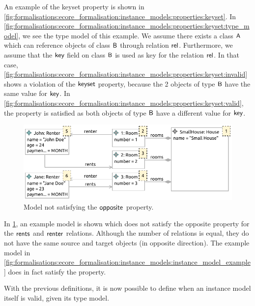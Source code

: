 An example of the keyset property is shown in \cref{fig:formalisations:ecore_formalisation:instance_models:properties:keyset}. In \cref{fig:formalisations:ecore_formalisation:instance_models:properties:keyset:type_model}, we see the type model of this example. We assume there exists a class $\mathsf{A}$ which can reference objects of class $\mathsf{B}$ through relation $\mathsf{rel}$. Furthermore, we assume that the $\mathsf{key}$ field on class $\mathsf{B}$ is used as key for the relation $\mathsf{rel}$. In that case, \cref{fig:formalisations:ecore_formalisation:instance_models:properties:keyset:invalid} shows a violation of the $\mathsf{keyset}$ property, because the 2 objects of type $\mathsf{B}$ have the same value for $\mathsf{key}$. In \cref{fig:formalisations:ecore_formalisation:instance_models:properties:keyset:valid}, the property is satisfied as both objects of type $\mathsf{B}$ have a different value for $\mathsf{key}$.

\begin{figure}[p]
    \centering
    \includegraphics{images/03_formalisations/02_ecore_formalisation/properties/invalid_opposite.pdf}
    \caption{Model not satisfying the $\mathsf{opposite}$ property.}
    \label{fig:formalisations:ecore_formalisation:instance_models:properties:opposite}
\end{figure}

In \cref{fig:formalisations:ecore_formalisation:instance_models:properties:opposite}, an example model is shown which does not satisfy the opposite property for the $\mathsf{rents}$ and $\mathsf{renter}$ relations. Although the number of relations is equal, they do not have the same source and target objects (in opposite direction). The example model in \cref{fig:formalisations:ecore_formalisation:instance_models:instance_model_example} does in fact satisfy the property.

With the previous definitions, it is now possible to define when an instance model itself is valid, given its type model.

